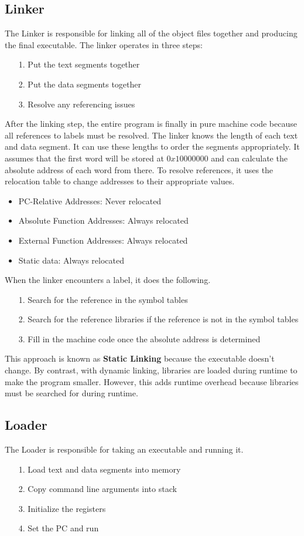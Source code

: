 \documentclass{article}
\begin{document}
\subsection{Linker}
The Linker is responsible for linking all of the object files together and producing the final executable.
The linker operates in three steps:
\begin{itemize}
    \item [1.] Put the text segments together
    \item [2.] Put the data segments together
    \item [3.] Resolve any referencing issues
\end{itemize}
After the linking step, the entire program is finally in pure machine code because all references to labels must be resolved.
The linker knows the length of each text and data segment. It can use these lengths to order the segments appropriately. It assumes
that the first word will be stored at $0x10000000$ and can calculate the absolute address of each word from there. To resolve references,
it uses the relocation table to change addresses to their appropriate values.
\begin{itemize}
    \item PC-Relative Addresses: Never relocated
    \item Absolute Function Addresses: Always relocated
    \item External Function Addresses: Always relocated
    \item Static data: Always relocated
\end{itemize}
When the linker encounters a label, it does the following.
\begin{itemize}
    \item[1.] Search for the reference in the symbol tables
    \item[2.] Search for the reference libraries if the reference is not in the symbol tables
    \item[3.] Fill in the machine code once the absolute address is determined 
\end{itemize}
This approach is known as \textbf{Static Linking} because the executable doesn't change. By contrast,
with dynamic linking, libraries are loaded during runtime to make the program smaller. However, this adds
runtime overhead because libraries must be searched for during runtime.
\subsection{Loader}
The Loader is responsible for taking an executable and running it.
\begin{itemize}
    \item[1.]Load text and data segments into memory
    \item[2.]Copy command line arguments into stack
    \item[3.]Initialize the registers
    \item[4.]Set the PC and run  
\end{itemize}
\end{document}
